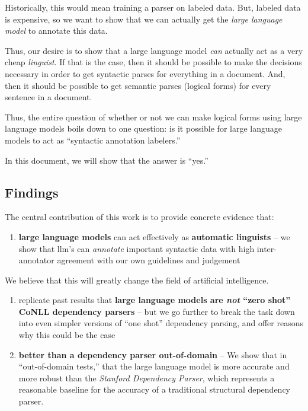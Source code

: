 Historically, this would mean training a parser on labeled data.
But, labeled data is expensive, so we want to show that we can actually get the {\em large language model} to annotate this data.

Thus, our desire is to show that a large language model {\em can} actually act as a very cheap {\em linguist}.
If that is the case, then it should be possible to make the decisions necessary in order to get syntactic parses for everything in a document.
And, then it should be possible to get semantic parses (logical forms) for every sentence in a document.

Thus, the entire question of whether or not we can make logical forms using large language models boils down to one question: is it possible for large language models to act as ``syntactic annotation labelers.''

In this document, we will show that the answer is ``yes.''

\subsection{Findings}
The central contribution of this work is to provide concrete evidence that:
\begin{enumerate}
    \item {\bf large language models} can act effectively as {\bf automatic linguists} -- we show that llm's can {\em annotate} important syntactic data with high inter-annotator agreement with our own guidelines and judgement
\end{enumerate}
We believe that this will greatly change the field of artificial intelligence.



\begin{enumerate}
    \item replicate past results that {\bf large language models are {\em not} ``zero shot'' CoNLL dependency parsers} -- but we go further to break the task down into even simpler versions of ``one shot'' dependency parsing, and offer reasons why this could be the case
    \item {\bf better than a dependency parser out-of-domain} --
We show that in ``out-of-domain tests,'' that the large language model is more accurate and more robust than the {\em Stanford Dependency Parser}, which represents a reasonable baseline for the accuracy of a traditional structural dependency parser.
\end{enumerate}